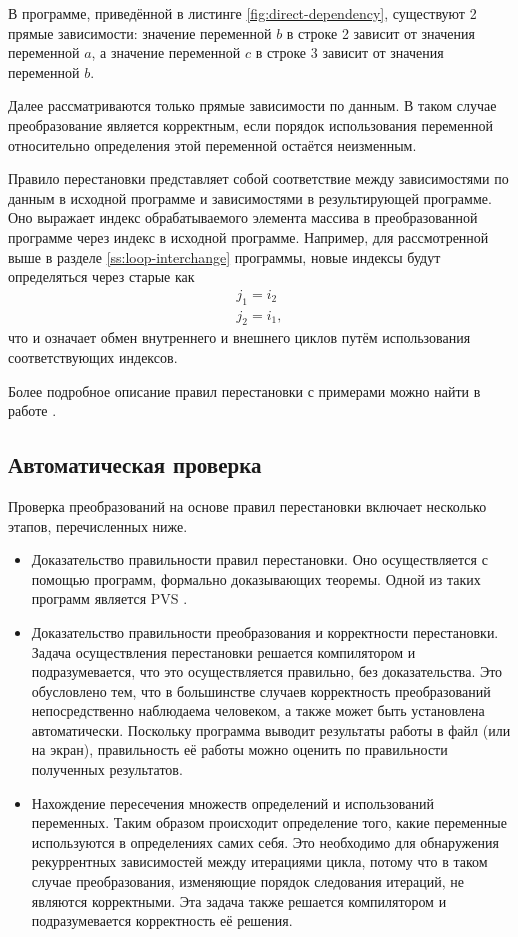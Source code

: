 В программе, приведённой в листинге \ref{fig:direct-dependency}, существуют 2 прямые зависимости: значение переменной $b$ в строке 2 зависит от значения переменной $a$, а значение переменной $c$ в строке 3 зависит от значения переменной $b$.

Далее рассматриваются только прямые зависимости по данным. В таком случае преобразование является корректным, если порядок использования переменной относительно определения этой переменной остаётся неизменным.

Правило перестановки представляет собой соответствие между зависимостями по данным в исходной программе и зависимостями в результирующей программе. Оно выражает индекс обрабатываемого элемента массива в преобразованной программе через индекс в исходной программе. Например, для рассмотренной выше в разделе \ref{ss:loop-interchange} программы, новые индексы будут определяться через старые как
\begin{eqnarray*}
j_1 = i_2~\\
j_2 = i_1,
\end{eqnarray*}
что и означает обмен внутреннего и внешнего циклов путём использования соответствующих индексов.

Более подробное описание правил перестановки с примерами можно найти в работе \cite{ZuckPFGH02}.

\subsection{Автоматическая проверка}

Проверка преобразований на основе правил перестановки включает несколько этапов, перечисленных ниже.

\begin{itemize}
	\item Доказательство правильности правил перестановки. Оно осуществляется с помощью программ, формально доказывающих теоремы. Одной из таких программ является PVS \cite{SOR93}.
	\item Доказательство правильности преобразования и корректности перестановки. Задача осуществления перестановки решается компилятором и подразумевается, что это осуществляется правильно, без доказательства. Это обусловлено тем, что в большинстве случаев корректность преобразований непосредственно наблюдаема человеком, а также может быть установлена автоматически. Поскольку программа выводит результаты работы в файл (или на экран), правильность её работы можно оценить по правильности полученных результатов.
	\item Нахождение пересечения множеств определений и использований переменных. Таким образом происходит определение того, какие переменные используются в определениях самих себя. Это необходимо для обнаружения рекуррентных зависимостей между итерациями цикла, потому что в таком случае преобразования, изменяющие порядок следования итераций, не являются корректными. Эта задача также решается компилятором и подразумевается корректность её решения.
\end{itemize}

